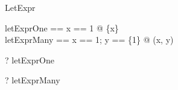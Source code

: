 \begin{zsection}
  \SECTION LetExpr
\end{zsection}

\begin{zed}
  letExprOne == \LET x == 1 @ \{x\}\\
  letExprMany == \LET x == 1; y == \{1\} @ (x, y)
\end{zed}

\begin{zed} \vdash? letExprOne \in \power \nat \end{zed}
\begin{zed} \vdash? letExprMany \in \nat \cross \power \nat \end{zed}
